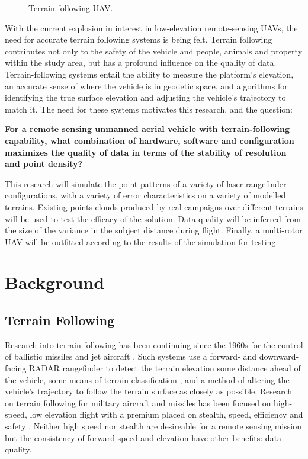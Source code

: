 \documentclass[10pt,a4paper]{report}
\begin{document}
\begin{figure}
\centering
\def\svgscale{0.5}

\caption{Terrain-following UAV.}
\label{fig:uav_terrain}
\end{figure}

With the current explosion in interest in low-elevation remote-sensing UAVs, the need for accurate terrain following systems is being felt. Terrain following contributes not only to the safety of the vehicle and people, animals and property within the study area, but has a profound influence on the quality of data. Terrain-following systems entail the ability to measure the platform's elevation, an accurate sense of where the vehicle is in geodetic space, and algorithms for identifying the true surface elevation and adjusting the vehicle's trajectory to match it. The need for these systems motivates this research, and the question:


\textbf{For a remote sensing unmanned aerial vehicle with terrain-following capability, what combination of hardware, software and configuration maximizes the quality of data in terms of the stability of resolution and point density?}

This research will simulate the point patterns of a variety of laser rangefinder configurations, with a variety of error characteristics on a variety of modelled terrains. Existing points clouds produced by real campaigns over different terrains will be used to test the efficacy of the solution. Data quality will be inferred from the size of the variance in the subject distance during flight. Finally, a multi-rotor UAV will be outfitted according to the results of the simulation for testing.

\section{Background}

\subsection{Terrain Following}

Research into terrain following has been continuing since the 1960s for the control of ballistic missiles and jet aircraft \cite{KRACHMALNICK1968,Starling1971,Cunningham1980}. Such systems use a forward- and downward-facing RADAR rangefinder to detect the terrain elevation some distance ahead of the vehicle, some means of terrain classification \cite{Cunningham1980}, and a method of altering the vehicle's trajectory to follow the terrain surface as closely as possible. Research on terrain following for military aircraft and missiles has been focused on high-speed, low elevation flight with a premium placed on stealth, speed, efficiency and safety \cite{KRACHMALNICK1968}. Neither high speed nor stealth are desireable for a remote sensing mission but the consistency of forward speed and elevation have other benefits: data quality.
\end{document}
